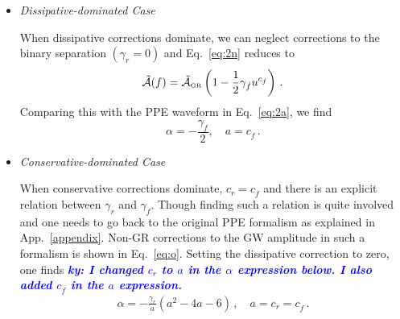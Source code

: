 \documentclass[prd,twocolumn,nofootinbib]{revtex4-1}
\newcommand{\GR}{{\mbox{\tiny GR}}}
\newcommand{\ky}[1]{\textcolor{blue}{\it{\textbf{ky: #1}}} }
\newcommand{\st}[1]{\textcolor{cyan}{\it{\textbf{st: #1}}} }
\begin{document}
\begin{itemize}

\item
\emph{Dissipative-dominated Case}

When dissipative corrections dominate, we can neglect corrections to the binary separation $(\gamma_{r} = 0)$ and Eq.~\eqref{eq:2n} reduces to
\begin{equation}
\tilde{\mathcal{A}}(f)=\tilde{\mathcal{A}}_{\GR} \left(1-\frac{1}{2}\gamma_{\dot{f}}u^{c_{\dot{f}}}\right)\,.
\end{equation}
Comparing this with the PPE waveform in Eq.~\eqref{eq:2a}, we find
\begin{equation}\label{eq:2t}
\alpha=-\frac{\gamma_{\dot{f}}}{2},\quad a=c_{\dot{f}}\,.
\end{equation}

\item
\emph{Conservative-dominated Case}

When conservative corrections dominate, $c_r = c_{\dot f}$ and there is an explicit relation between $\gamma_{r}$ and $\gamma_{\dot f}$. Though finding such a relation is quite involved and one needs to go back to the original PPE formalism as explained in App.~\ref{appendix}. Non-GR corrections to the GW amplitude in such a formalism is shown in Eq.~\eqref{eq:o}. Setting the dissipative correction to zero, one finds 
\ky{I changed $c_r$ to $a$ in the $\alpha$ expression below. I also added $c_{\dot f}$ in the $a$ expression.}
\begin{align}\label{eq:2u}
\alpha=-\frac{\gamma_r}{a}(a^2-4a-6)\,, \quad a=c_r = c_{\dot f}\,.
\end{align} 


\end{itemize}
\end{document}
